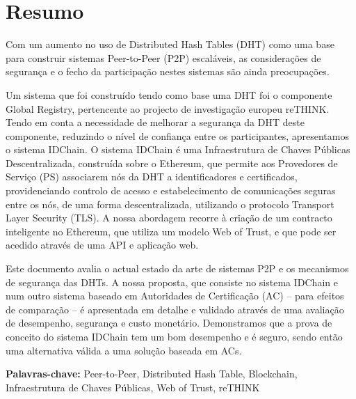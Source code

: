 \chapter*{Resumo}


Com um aumento no uso de Distributed Hash Tables (DHT) como uma base para construir sistemas Peer-to-Peer (P2P) escaláveis, as considerações de segurança e o fecho da participação nestes sistemas são ainda preocupações.

Um sistema que foi construído tendo como base uma DHT foi o componente Global Registry, pertencente ao projecto de investigação europeu reTHINK.
Tendo em conta a necessidade de melhorar a segurança da DHT deste componente, reduzindo o nível de confiança entre os participantes, apresentamos o sistema IDChain.
O sistema IDChain é uma Infraestrutura de Chaves Públicas Descentralizada, construída sobre o Ethereum, que permite aos Provedores de Serviço (PS) associarem nós da DHT a identificadores e certificados, providenciando controlo de acesso e estabelecimento de comunicações seguras entre os nós, de uma forma descentralizada, utilizando o protocolo Transport Layer Security (TLS).
A nossa abordagem recorre à criação de um contracto inteligente no Ethereum, que utiliza um modelo Web of Trust, e que pode ser acedido através de uma API e aplicação web.

Este documento avalia o actual estado da arte de sistemas P2P e os mecanismos de segurança das DHTs.
A nossa proposta, que consiste no sistema IDChain e num outro sistema baseado em Autoridades de Certificação (AC) – para efeitos de comparação – é apresentada em detalhe e validado através de uma avaliação de desempenho, segurança e custo monetário.
Demonstramos que a prova de conceito do sistema IDChain tem um bom desempenho e é seguro, sendo então uma alternativa válida a uma solução baseada em ACs.

\vspace{1cm}

\textbf{\Large Palavras-chave:} Peer-to-Peer, Distributed Hash Table, Blockchain, Infraestrutura de Chaves Públicas, Web of Trust, reTHINK

\cleardoublepage


